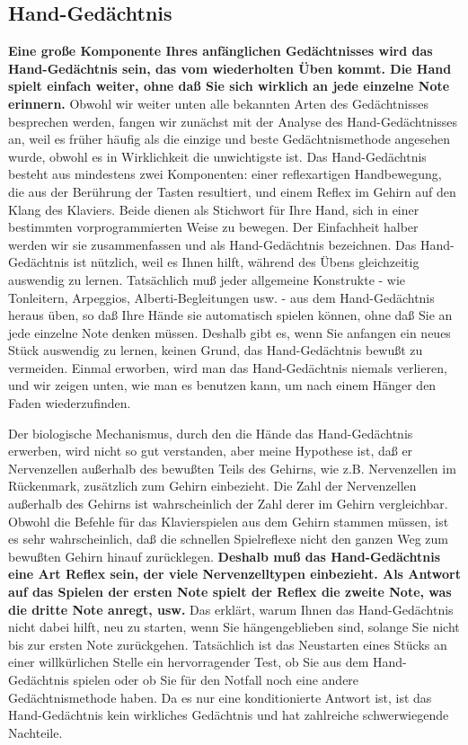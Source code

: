 \subsection{Hand-Gedächtnis}\hypertarget{c1iii6d}{}

\textbf{Eine große Komponente Ihres anfänglichen Gedächtnisses wird das Hand-Gedächtnis sein, das vom wiederholten Üben kommt.
Die Hand spielt einfach weiter, ohne daß Sie sich wirklich an jede einzelne Note  erinnern.}
Obwohl wir weiter unten alle bekannten Arten des Gedächtnisses besprechen werden, fangen wir zunächst mit der Analyse des Hand-Gedächtnisses an, weil es früher häufig als die einzige und beste Gedächtnismethode angesehen wurde, obwohl es in Wirklichkeit die unwichtigste ist.
Das Hand-Gedächtnis besteht aus mindestens zwei Komponenten: einer reflexartigen Handbewegung, die aus der Berührung der Tasten resultiert, und einem Reflex im Gehirn auf den Klang des Klaviers.
Beide dienen als Stichwort für Ihre Hand, sich in einer bestimmten vorprogrammierten Weise zu bewegen.
Der Einfachheit halber werden wir sie zusammenfassen und als Hand-Gedächtnis bezeichnen.
Das Hand-Gedächtnis ist nützlich, weil es Ihnen hilft, während des Übens gleichzeitig auswendig zu lernen.
Tatsächlich muß jeder allgemeine Konstrukte - wie Tonleitern, Arpeggios, Alberti-Begleitungen usw. - aus dem Hand-Gedächtnis heraus üben, so daß Ihre Hände sie automatisch spielen können, ohne daß Sie an jede einzelne Note denken müssen.
Deshalb gibt es, wenn Sie anfangen ein neues Stück auswendig zu lernen, keinen Grund, das Hand-Gedächtnis bewußt zu vermeiden.
Einmal erworben, wird man das Hand-Gedächtnis niemals verlieren, und wir zeigen unten, wie man es benutzen kann, um nach einem Hänger den Faden wiederzufinden.

Der biologische Mechanismus, durch den die Hände das Hand-Gedächtnis erwerben, wird nicht so gut verstanden, aber meine Hypothese ist, daß er Nervenzellen außerhalb des bewußten Teils des Gehirns, wie z.B. Nervenzellen im Rückenmark, zusätzlich zum Gehirn einbezieht.
Die Zahl der Nervenzellen außerhalb des Gehirns ist wahrscheinlich der Zahl derer im Gehirn vergleichbar.
Obwohl die Befehle für das Klavierspielen aus dem Gehirn stammen müssen, ist es sehr wahrscheinlich, daß die schnellen Spielreflexe nicht den ganzen Weg zum bewußten Gehirn hinauf zurücklegen.
\textbf{Deshalb muß das Hand-Gedächtnis eine Art Reflex sein, der viele Nervenzelltypen einbezieht.
Als Antwort auf das Spielen der ersten Note spielt der Reflex die zweite Note, was die dritte Note anregt, usw.}
Das erklärt, warum Ihnen das Hand-Gedächtnis nicht dabei hilft, neu zu starten, wenn Sie hängengeblieben sind, solange Sie nicht bis zur ersten Note zurückgehen.
Tatsächlich ist das Neustarten eines Stücks an einer willkürlichen Stelle ein hervorragender Test, ob Sie aus dem Hand-Gedächtnis spielen oder ob Sie für den Notfall noch eine andere Gedächtnismethode haben.
Da es nur eine konditionierte Antwort ist, ist das Hand-Gedächtnis kein wirkliches Gedächtnis und hat zahlreiche schwerwiegende Nachteile.

